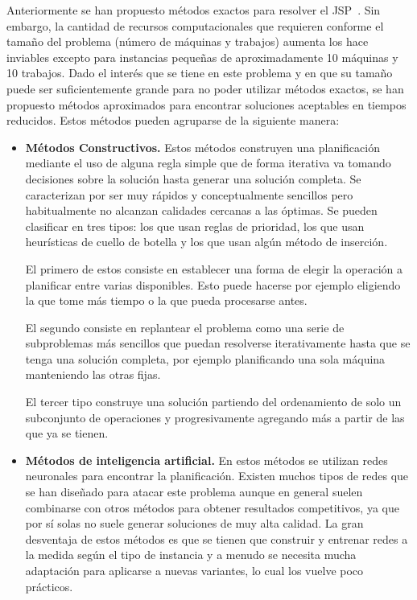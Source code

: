 Anteriormente se han propuesto métodos exactos para resolver el JSP~\cite{Brucker1994}. 
%
Sin embargo, la cantidad de recursos computacionales que requieren conforme el tamaño del problema (número de máquinas y trabajos) aumenta los hace inviables excepto 
para instancias pequeñas de aproximadamente 10 máquinas y 10 trabajos.
%
Dado el interés que se tiene en este problema y en que su tamaño puede ser suficientemente grande para no poder utilizar métodos exactos, se han propuesto métodos aproximados 
para encontrar soluciones aceptables en tiempos reducidos. 
%
Estos métodos pueden agruparse de la siguiente manera\cite{jain1998state,Zhang2019}:
\begin{itemize}
\item \textbf{Métodos Constructivos.} Estos métodos construyen una planificación mediante el uso de alguna regla simple que de forma iterativa va tomando decisiones sobre la solución
hasta generar una solución completa. Se caracterizan por ser muy rápidos y conceptualmente sencillos pero habitualmente no alcanzan calidades cercanas a las óptimas.
Se pueden clasificar en tres tipos: los que usan reglas de prioridad, los que usan heurísticas de cuello de botella y los que usan algún método de inserción.

El primero de estos consiste en establecer una forma de elegir la operación a planificar entre varias disponibles. Esto puede hacerse por ejemplo eligiendo la que tome 
más tiempo o la que pueda procesarse antes.

El segundo consiste en replantear el problema como una serie de subproblemas más sencillos que puedan resolverse iterativamente hasta que se tenga una solución completa, 
por ejemplo planificando una sola máquina manteniendo las otras fijas.

El tercer tipo construye una solución partiendo del ordenamiento de solo un subconjunto de operaciones y progresivamente agregando más a partir de las que ya se tienen.

\item \textbf{Métodos de inteligencia artificial.} En estos métodos se utilizan redes neuronales para encontrar la planificación. Existen muchos tipos de redes que se 
han diseñado para atacar este problema aunque en general suelen combinarse con otros métodos para obtener resultados competitivos, ya que por sí solas no suele generar
soluciones de muy alta calidad. La gran desventaja de estos métodos es que se tienen que construir y entrenar redes a la medida según el tipo de instancia y a menudo 
se necesita mucha adaptación para aplicarse a nuevas variantes, lo cual los vuelve poco prácticos.


\end{itemize}
